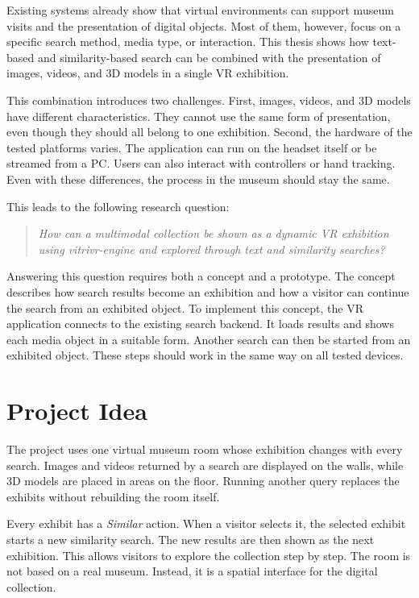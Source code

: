 Existing systems already show that virtual environments can support museum visits and the presentation of digital objects. Most of them, however, focus on a specific search method, media type, or interaction. This thesis shows how text-based and similarity-based search can be combined with the presentation of images, videos, and 3D models in a single VR exhibition.

This combination introduces two challenges. First, images, videos, and 3D models have different characteristics. They cannot use the same form of presentation, even though they should all belong to one exhibition. Second, the hardware of the tested platforms varies. The application can run on the headset itself or be streamed from a PC. Users can also interact with controllers or hand tracking. Even with these differences, the process in the museum should stay the same.

This leads to the following research question:

\begin{quote}
\emph{How can a multimodal collection be shown as a dynamic VR exhibition using vitrivr-engine and explored through text and similarity searches?}
\end{quote}

Answering this question requires both a concept and a prototype. The concept describes how search results become an exhibition and how a visitor can continue the search from an exhibited object. To implement this concept, the VR application connects to the existing search backend. It loads results and shows each media object in a suitable form. Another search can then be started from an exhibited object. These steps should work in the same way on all tested devices.

\section{Project Idea}
\label{sec:introduction-project-idea}

The project uses one virtual museum room whose exhibition changes with every search. Images and videos returned by a search are displayed on the walls, while 3D models are placed in areas on the floor. Running another query replaces the exhibits without rebuilding the room itself.

Every exhibit has a \emph{Similar} action. When a visitor selects it, the selected exhibit starts a new similarity search. The new results are then shown as the next exhibition. This allows visitors to explore the collection step by step. The room is not based on a real museum. Instead, it is a spatial interface for the digital collection.

